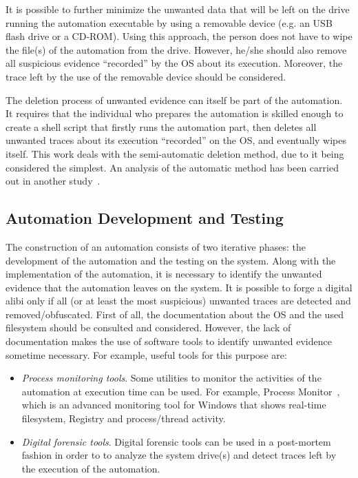 \documentclass[runningheads]{llncs}
\begin{document}
It is possible to further minimize the unwanted data that will be left on the drive running the automation executable by using a removable device (e.g. an USB  flash drive or a CD-ROM). Using this approach, the person does not have to wipe the file(s) of the automation from the drive. However, he/she should also remove all suspicious evidence ``recorded'' by the OS about its execution. Moreover, the trace left by the use of the removable device should be considered.

The deletion process of unwanted evidence can itself be part of the automation. It requires that the individual who prepares the automation is skilled enough to create a shell script that firstly runs the automation part, then deletes all unwanted traces about its execution ``recorded'' on the OS, and eventually wipes itself.
This work deals with the semi-automatic deletion method, due to it being considered the simplest. An analysis of the automatic method has been carried out in another study~\cite{cancellazione}.

\subsection{Automation Development and Testing }
\label{subsub:devetest}

The construction of an automation consists of two iterative phases:
the development of the automation and the testing on the system.
Along with the implementation of the automation, it is necessary to identify the unwanted evidence that the automation leaves on the system. It is possible to forge a digital alibi only if all (or at least the most suspicious) unwanted traces are detected and removed/obfuscated. %
First of all, the documentation about the OS and the used filesystem should be consulted and considered. However, the lack of documentation makes the use of software tools to identify unwanted evidence sometime necessary. For example, useful tools for this purpose are:

\begin{itemize}
 \item \emph{Process monitoring tools}.
 Some utilities to monitor the activities of the automation at execution time can be used. For example, Process Monitor~\cite{procmon}, which is an advanced monitoring tool for Windows that shows real-time filesystem, Registry and process/thread activity.
 \item \emph{Digital forensic tools}.
 Digital forensic tools can be used in a post-mortem fashion in order to to analyze the system drive(s) and detect traces left by the execution of the automation.
\end{itemize}
\end{document}

